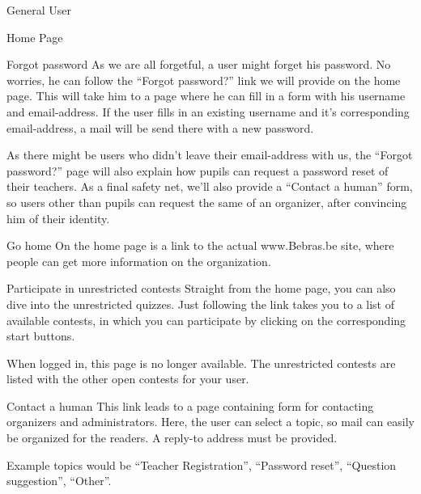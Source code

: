 \begin{section}{General User}
\begin{subsection}{Home Page}
        \begin{subsubsection}{Forgot password}
            As we are all forgetful, a user might forget his password. No
            worries, he can follow the ``Forgot password?'' link we will provide
            on the home page. This will take him to a page where he can fill in
            a form with his username and email-address. If the user fills in an
            existing username and it's corresponding email-address, a mail will
            be send there with a new password.

            As there might be users who didn't leave their email-address with
            us, the ``Forgot password?'' page will also explain how pupils can
            request a password reset of their teachers. As a final safety net,
            we'll also provide a ``Contact a human'' form, so users other than
            pupils can request the same of an organizer, after convincing him of
            their identity.
        \end{subsubsection}

        \begin{subsubsection}{Go home}
            On the home page is a link to the actual www.Bebras.be site, where
            people can get more information on the organization.
        \end{subsubsection}

        \begin{subsubsection}{Participate in unrestricted contests}
            Straight from the home page, you can also dive into the unrestricted
            quizzes. Just following the link takes you to a list of available
            contests, in which you can participate by clicking on the
            corresponding start buttons.

            When logged in, this page is no longer available. The unrestricted
            contests are listed with the other open contests for your user.
        \end{subsubsection}

        \begin{subsubsection}{Contact a human}
            This link leads to a page containing form for contacting organizers
            and administrators. Here, the user can select a topic, so mail can
            easily be organized for the readers. A reply-to address must be
            provided.

            Example topics would be ``Teacher Registration'', ``Password
            reset'', ``Question suggestion'', ``Other''.
        \end{subsubsection}


\end{subsection}
\end{section}
